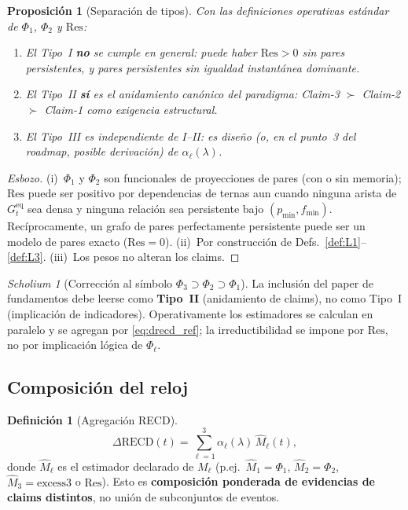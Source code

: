 \documentclass[11pt,a4paper]{article}
\theoremstyle{definition}
\newtheorem{definition}{Definici\'on}[section]
\theoremstyle{plain}
\newtheorem{proposition}{Proposici\'on}[section]
\theoremstyle{remark}
\newtheorem{scholium}{Scholium}[section]
\newcommand{\Res}{\mathrm{Res}}
\newcommand{\RECD}{\mathrm{RECD}}
\newcommand{\excess}{\mathrm{excess3}}
\begin{document}
\begin{proposition}[Separaci\'on de tipos]
\label{prop:separation}
Con las definiciones operativas est\'andar de $\Phi_1$, $\Phi_2$ y
$\Res$:
\begin{enumerate}[label=(\roman*)]
  \item El Tipo~I \textbf{no} se cumple en general:
  puede haber $\Res>0$ sin pares persistentes, y pares persistentes sin
  igualdad instant\'anea dominante.
  \item El Tipo~II \textbf{s\'i} es el anidamiento can\'onico del
  paradigma: Claim-3 $\succ$ Claim-2 $\succ$ Claim-1 como
  \emph{exigencia estructural}.
  \item El Tipo~III es independiente de I--II: es dise\~no (o, en el
  punto~3 del roadmap, posible derivaci\'on) de $\alpha_\ell(\lambda)$.
\end{enumerate}
\end{proposition}

\begin{proof}[Esbozo]
(i)~$\Phi_1$ y $\Phi_2$ son funcionales de proyecciones de pares (con o
sin memoria); $\Res$ puede ser positivo por dependencias de ternas aun
cuando ninguna arista de $G_t^{\mathrm{eq}}$ sea densa y ninguna
relaci\'on sea persistente bajo $(p_{\min},f_{\min})$. Rec\'iprocamente,
un grafo de pares perfectamente persistente puede ser un modelo de
pares exacto ($\Res=0$). (ii)~Por construcci\'on de
Defs.~\ref{def:L1}--\ref{def:L3}. (iii)~Los pesos no alteran los claims.
\end{proof}

\begin{scholium}[Correcci\'on al s\'imbolo $\Phi_3\supset\Phi_2\supset\Phi_1$]
La inclusi\'on del paper de fundamentos debe leerse como \textbf{Tipo~II}
(anidamiento de claims), no como Tipo~I (implicaci\'on de indicadores).
Operativamente los estimadores se calculan en paralelo y se agregan por
\eqref{eq:drecd_ref}; la irreductibilidad se impone por $\Res$, no por
implicaci\'on l\'ogica de $\Phi_\ell$.
\end{scholium}

\subsection{Composici\'on del reloj}

\begin{definition}[Agregaci\'on RECD]
\label{def:composition}
\begin{equation}
\label{eq:drecd_ref}
\Delta\RECD(t)
=\sum_{\ell=1}^{3}\alpha_\ell(\lambda)\, \widehat{M}_\ell(t),
\end{equation}
donde $\widehat{M}_\ell$ es el estimador declarado de $M_\ell$ (p.ej.\
$\widehat{M}_1=\Phi_1$, $\widehat{M}_2=\Phi_2$,
$\widehat{M}_3=\excess$ o $\Res$). Esto es \textbf{composici\'on
ponderada de evidencias de claims distintos}, no uni\'on de
subconjuntos de eventos.
\end{definition}
\end{document}

